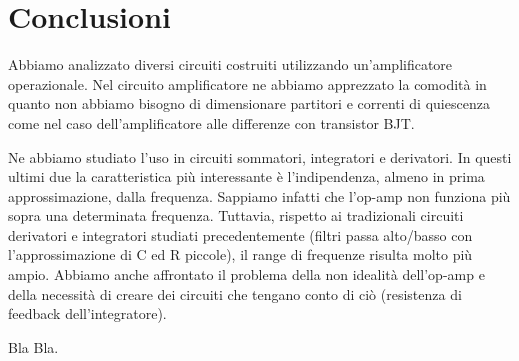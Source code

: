\section{Conclusioni}

Abbiamo analizzato diversi circuiti costruiti utilizzando un'amplificatore operazionale. Nel circuito amplificatore ne abbiamo apprezzato la comodità in quanto non abbiamo bisogno di dimensionare partitori e correnti di quiescenza come nel caso dell'amplificatore alle differenze con transistor BJT. 

Ne abbiamo studiato l'uso in circuiti sommatori, integratori e derivatori.
In questi ultimi due la caratteristica più interessante è l'indipendenza, almeno in prima approssimazione, dalla frequenza.
Sappiamo infatti che l'op-amp non funziona più sopra una determinata frequenza.
Tuttavia, rispetto ai tradizionali circuiti derivatori e integratori studiati precedentemente (filtri passa alto/basso con l'approssimazione di C ed R piccole), il range di frequenze risulta molto più ampio.
Abbiamo anche affrontato il problema della non idealità dell'op-amp e della necessità di creare dei circuiti che tengano conto di ciò (resistenza di feedback dell'integratore).

Bla Bla.